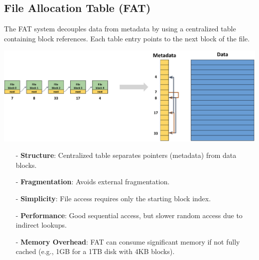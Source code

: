 \subsection{File Allocation Table (FAT)}
The FAT system decouples data from metadata by using a centralized table containing block references. Each table entry points to the next block of the file.
\begin{center}
  \includegraphics[width=1.05\textwidth]{chapters/L6/images/fat.png}
\end{center}
\begin{itemize}[itemsep=2pt, topsep=1pt]
    \item[-] \textbf{Structure}: Centralized table separates pointers (metadata) from data blocks.
    \item[-] \textbf{Fragmentation}: Avoids external fragmentation.
    \item[-] \textbf{Simplicity}: File access requires only the starting block index.
    \item[-] \textbf{Performance}: Good sequential access, but slower random access due to indirect lookups.
    \item[-] \textbf{Memory Overhead}: FAT can consume significant memory if not fully cached (e.g., 1GB for a 1TB disk with 4KB blocks).
\end{itemize}


